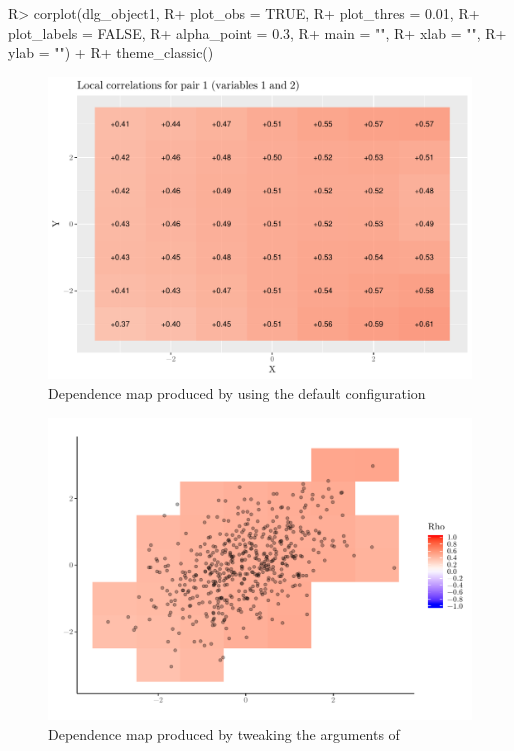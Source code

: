 \begin{example}
R> corplot(dlg_object1, 
R+         plot_obs = TRUE, 
R+         plot_thres = 0.01,
R+         plot_labels = FALSE,
R+         alpha_point = 0.3,
R+         main = "",
R+         xlab = "",
R+         ylab = "") +
R+   theme_classic()
\end{example}

\begin{figure}[p]
\centering 
\includegraphics[width = \textwidth]{graphics1} 
\caption{Dependence map produced by  using the default configuration}
\label{fig:graphics1}
\end{figure}


\begin{figure}[p]
\centering 
\includegraphics[width = \textwidth]{graphics2} 
\caption{Dependence map produced by tweaking the arguments of }
\label{fig:graphics2}
\end{figure}

